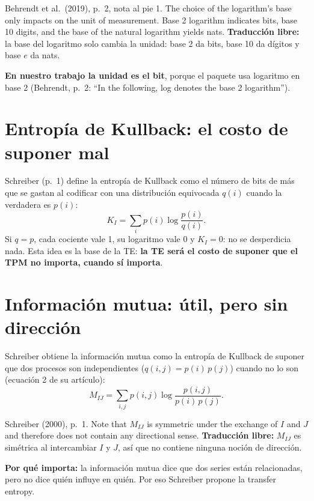 \documentclass[11pt,openany]{book}
\begin{document}
\begin{cita}{Behrendt et al.\ (2019), p.~2, nota al pie 1.}
The choice of the logarithm’s base only impacts on the unit of measurement. Base 2 logarithm indicates bits, base 10 digits, and the base of the natural logarithm yields nats.
\tcblower
\textbf{Traducción libre:} la base del logaritmo solo cambia la unidad: base 2 da bits, base 10 da dígitos y base $e$ da nats.
\end{cita}

\textbf{En nuestro trabajo la unidad es el bit}, porque el paquete usa logaritmo en base 2 (Behrendt, p.~2: ``In the following, log denotes the base 2 logarithm'').

\section{Entropía de Kullback: el costo de suponer mal}

Schreiber (p.~1) define la entropía de Kullback como el número de bits de más que se gastan al codificar con una distribución equivocada $q(i)$ cuando la verdadera es $p(i)$:
\[ K_I = \sum_i p(i)\log\frac{p(i)}{q(i)}. \]
Si $q = p$, cada cociente vale 1, su logaritmo vale 0 y $K_I = 0$: no se desperdicia nada. Esta idea es la base de la TE: \textbf{la TE será el costo de suponer que el TPM no importa, cuando sí importa}.

\section{Información mutua: útil, pero sin dirección}

Schreiber obtiene la información mutua como la entropía de Kullback de suponer que dos procesos son independientes ($q(i,j) = p(i)\,p(j)$) cuando no lo son (ecuación 2 de su artículo):
\[ M_{IJ} = \sum_{i,j} p(i,j)\log\frac{p(i,j)}{p(i)\,p(j)}. \]

\begin{cita}{Schreiber (2000), p.~1.}
Note that $M_{IJ}$ is symmetric under the exchange of $I$ and $J$ and therefore does not contain any directional sense.
\tcblower
\textbf{Traducción libre:} $M_{IJ}$ es simétrica al intercambiar $I$ y $J$, así que no contiene ninguna noción de dirección.
\end{cita}

\textbf{Por qué importa:} la información mutua dice que dos series están relacionadas, pero no dice quién influye en quién. Por eso Schreiber propone la transfer entropy.
\end{document}

